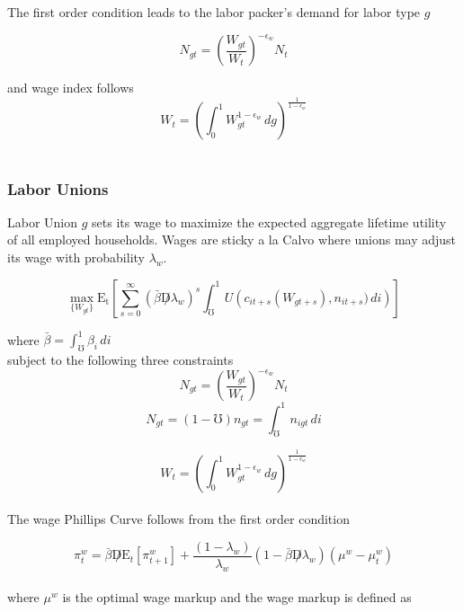 \documentclass[titlepage]{\econtex}\providecommand{\texname}{BufferStockTheory}
\begin{document}
The first order condition leads to the labor packer's demand for labor type $g$

\begin{equation} N_{gt} = \left(\frac{W_{gt}}{W_{t}}\right)^{-\epsilon_{w}} N_{t} \end{equation}

and wage index follows
\begin{equation} W_{t} = \left(\int_{0}^{1} W_{gt}^{1-\epsilon_{w}}\,dg\right)^{\frac{1}{1-\epsilon_{w}}}\end{equation} \\




\hypertarget{Labor Unions}{}
\subsubsection{Labor Unions}

Labor Union $g$  sets its wage to maximize the expected aggregate lifetime utility of all employed households. Wages are sticky a la Calvo where unions may adjust its wage with probability $\lambda_{w}$. 

$$ \max_{\{W_{gt}\}} \mathrm{E_{t}}\left[\sum_{s=0}^{\infty} (\bar{\beta} \not D \lambda_{w})^{s} \int_{\mho}^{1}  U\left (c_{it+s}(W_{gt+s}), n_{i t+s}) \, di \right)\right] $$

where $\bar{\beta} = \int_{\mho}^{1} \beta_{i} \, di$ \\

subject to the following three constraints $$ N_{gt} = \left(\frac{W_{gt}}{W_{t}}\right)^{-\epsilon_{w}} N_{t} $$
$$  N_{gt} = (1-\mho) \mathit{n}_{gt} = \int_{\mho}^{1} n_{igt}\,di $$ 

$$ W_{t} = \left(\int_{0}^{1} W_{gt}^{1-\epsilon_{w}}\,dg\right)^{\frac{1}{1-\epsilon_{w}}}$$ \\



The wage Phillips Curve follows from the first order condition


\begin{equation} \pi_{t}^{w} =   \bar{\beta} \not D  \mathrm{E}_{t} \left[ \pi_{t+1}^{w}\right] + \frac{(1-\lambda_{w})}{\lambda_{w}} (1- \bar{\beta} \not D \lambda_{w}) (\mu^{w} - \mu_{t}^{w})\end{equation} \\

where $\mu^{w}$ is the optimal wage markup and the wage markup is defined as \\ 
\end{document}
